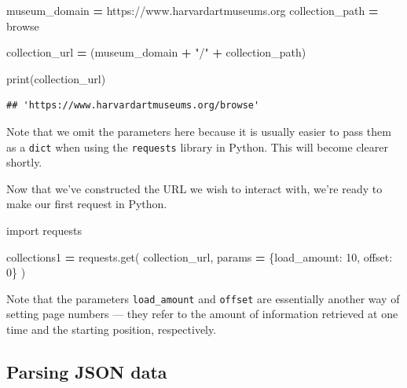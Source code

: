 \documentclass[
]{book}
\newenvironment{Shaded}{\begin{snugshade}}{\end{snugshade}}
\newcommand{\BuiltInTok}[1]{#1}
\newcommand{\DecValTok}[1]{\textcolor[rgb]{0.00,0.00,0.81}{#1}}
\newcommand{\ImportTok}[1]{#1}
\newcommand{\NormalTok}[1]{#1}
\newcommand{\OperatorTok}[1]{\textcolor[rgb]{0.81,0.36,0.00}{\textbf{#1}}}
\newcommand{\StringTok}[1]{\textcolor[rgb]{0.31,0.60,0.02}{#1}}
\begin{document}
\begin{Shaded}
\begin{Highlighting}[]
\NormalTok{museum\_domain }\OperatorTok{=} \StringTok{\textquotesingle{}https://www.harvardartmuseums.org\textquotesingle{}}
\NormalTok{collection\_path }\OperatorTok{=} \StringTok{\textquotesingle{}browse\textquotesingle{}}

\NormalTok{collection\_url }\OperatorTok{=}\NormalTok{ (museum\_domain}
                  \OperatorTok{+} \StringTok{"/"}
                  \OperatorTok{+}\NormalTok{ collection\_path)}

\BuiltInTok{print}\NormalTok{(collection\_url)}
\end{Highlighting}
\end{Shaded}

\begin{verbatim}
## 'https://www.harvardartmuseums.org/browse'
\end{verbatim}

Note that we omit the parameters here because it is usually easier to pass them as a \texttt{dict} when using the \texttt{requests} library in Python. This will become clearer shortly.

Now that we've constructed the URL we wish to interact with, we're ready to make our first request in Python.

\begin{Shaded}
\begin{Highlighting}[]
\ImportTok{import}\NormalTok{ requests}

\NormalTok{collections1 }\OperatorTok{=}\NormalTok{ requests.get(}
\NormalTok{    collection\_url,}
\NormalTok{    params }\OperatorTok{=}\NormalTok{ \{}\StringTok{\textquotesingle{}load\_amount\textquotesingle{}}\NormalTok{: }\DecValTok{10}\NormalTok{,}
                  \StringTok{\textquotesingle{}offset\textquotesingle{}}\NormalTok{: }\DecValTok{0}\NormalTok{\}}
\NormalTok{)}
\end{Highlighting}
\end{Shaded}

Note that the parameters \texttt{load\_amount} and \texttt{offset} are essentially another way of setting page numbers --- they refer to the amount of information retrieved at one time and the starting position, respectively.

\hypertarget{parsing-json-data}{%
\subsection{Parsing JSON data}\label{parsing-json-data}}
\end{document}
